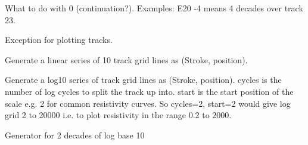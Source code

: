 \documentclass[letterpaper,10pt,english]{sphinxmanual}
\begin{document}
What to do with 0 (continuation?).
Examples: E20   -4\textendash{} means 4 decades over track 23.

\begin{fulllineitems}
\label{\detokenize{ref/util/plot/Track:TotalDepth.util.plot.Track.ExceptionTotalDepthLISPlotTrack}}
Exception for plotting tracks.

\end{fulllineitems}


\begin{fulllineitems}
\label{\detokenize{ref/util/plot/Track:TotalDepth.util.plot.Track.genLinear10}}
Generate a linear series of 10 track grid lines as (Stroke, position).

\end{fulllineitems}


\begin{fulllineitems}
\label{\detokenize{ref/util/plot/Track:TotalDepth.util.plot.Track.genLog10}}
Generate a log10 series of track grid lines as (Stroke, position).
cycles is the number of log cycles to split the track up into.
start is the start position of the scale e.g. 2 for common resistivity curves.
So cycles=2, start=2 would give log grid 2 to 20000 i.e. to plot
resistivity in the range 0.2 to 2000.

\end{fulllineitems}


\begin{fulllineitems}
\label{\detokenize{ref/util/plot/Track:TotalDepth.util.plot.Track.genLog10Decade2}}
Generator for 2 decades of log base 10

\end{fulllineitems}
\end{document}
